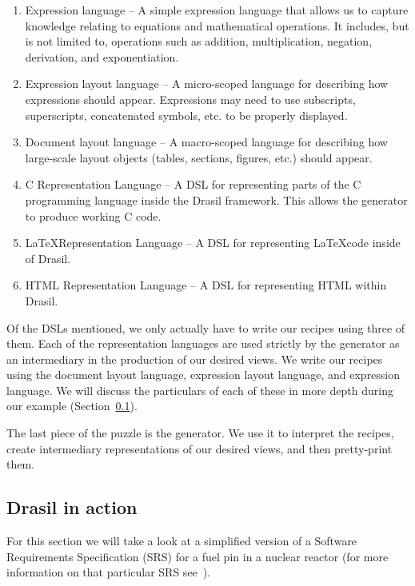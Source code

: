 \documentclass[preprint, 10pt]{sigplanconf}
\begin{document}
\begin{enumerate}
\item Expression language -- A simple expression language that allows us to
capture knowledge relating to equations and mathematical operations. It
includes, but is not limited to, operations such as addition, multiplication,
negation, derivation, and exponentiation.

\item Expression layout language -- A micro-scoped language for describing how
expressions should appear. Expressions may need to use subscripts, superscripts,
concatenated symbols, etc. to be properly displayed.

\item Document layout language -- A macro-scoped language for describing how
large-scale layout objects (tables, sections, figures, etc.) should appear.

\item C Representation Language -- A DSL for representing parts of the C
programming language inside the Drasil framework. This allows the generator to
produce working C code.

\item \LaTeX Representation Language -- A DSL for representing \LaTeX code
inside of Drasil.

\item HTML Representation Language -- A DSL for representing HTML within Drasil.
\end{enumerate}

Of the DSLs mentioned, we only actually have to write our recipes using three of
them. Each of the representation languages are used strictly by the generator as
an intermediary in the production of our desired views. We write our recipes
using the document layout language, expression layout language, and expression
language. We will discuss the particulars of each of these in more depth during
our example (Section~\ref{subsec:example}).

The last piece of the puzzle is the generator. We use it to interpret the
recipes, create intermediary representations of our desired views, and then
pretty-print them.

\subsection{Drasil in action} 
\label{subsec:example}

For this section we will take a look at a simplified version of a Software
Requirements Specification (SRS) for a fuel pin in a nuclear reactor (for more
information on that particular SRS see~\cite{SmithAndKoothoor2016}).
\end{document}

